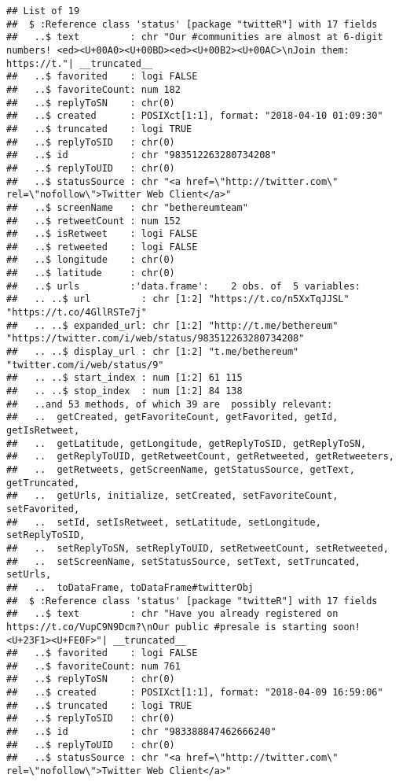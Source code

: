 \documentclass[]{article}
\begin{document}
\begin{verbatim}
## List of 19
##  $ :Reference class 'status' [package "twitteR"] with 17 fields
##   ..$ text         : chr "Our #communities are almost at 6-digit numbers! <ed><U+00A0><U+00BD><ed><U+00B2><U+00AC>\nJoin them: https://t."| __truncated__
##   ..$ favorited    : logi FALSE
##   ..$ favoriteCount: num 182
##   ..$ replyToSN    : chr(0) 
##   ..$ created      : POSIXct[1:1], format: "2018-04-10 01:09:30"
##   ..$ truncated    : logi TRUE
##   ..$ replyToSID   : chr(0) 
##   ..$ id           : chr "983512263280734208"
##   ..$ replyToUID   : chr(0) 
##   ..$ statusSource : chr "<a href=\"http://twitter.com\" rel=\"nofollow\">Twitter Web Client</a>"
##   ..$ screenName   : chr "bethereumteam"
##   ..$ retweetCount : num 152
##   ..$ isRetweet    : logi FALSE
##   ..$ retweeted    : logi FALSE
##   ..$ longitude    : chr(0) 
##   ..$ latitude     : chr(0) 
##   ..$ urls         :'data.frame':    2 obs. of  5 variables:
##   .. ..$ url         : chr [1:2] "https://t.co/n5XxTqJJSL" "https://t.co/4GllRSTe7j"
##   .. ..$ expanded_url: chr [1:2] "http://t.me/bethereum" "https://twitter.com/i/web/status/983512263280734208"
##   .. ..$ display_url : chr [1:2] "t.me/bethereum" "twitter.com/i/web/status/9"
##   .. ..$ start_index : num [1:2] 61 115
##   .. ..$ stop_index  : num [1:2] 84 138
##   ..and 53 methods, of which 39 are  possibly relevant:
##   ..  getCreated, getFavoriteCount, getFavorited, getId, getIsRetweet,
##   ..  getLatitude, getLongitude, getReplyToSID, getReplyToSN,
##   ..  getReplyToUID, getRetweetCount, getRetweeted, getRetweeters,
##   ..  getRetweets, getScreenName, getStatusSource, getText, getTruncated,
##   ..  getUrls, initialize, setCreated, setFavoriteCount, setFavorited,
##   ..  setId, setIsRetweet, setLatitude, setLongitude, setReplyToSID,
##   ..  setReplyToSN, setReplyToUID, setRetweetCount, setRetweeted,
##   ..  setScreenName, setStatusSource, setText, setTruncated, setUrls,
##   ..  toDataFrame, toDataFrame#twitterObj
##  $ :Reference class 'status' [package "twitteR"] with 17 fields
##   ..$ text         : chr "Have you already registered on https://t.co/VupC9N9Dcm?\nOur public #presale is starting soon! <U+23F1><U+FE0F>"| __truncated__
##   ..$ favorited    : logi FALSE
##   ..$ favoriteCount: num 761
##   ..$ replyToSN    : chr(0) 
##   ..$ created      : POSIXct[1:1], format: "2018-04-09 16:59:06"
##   ..$ truncated    : logi TRUE
##   ..$ replyToSID   : chr(0) 
##   ..$ id           : chr "983388847462666240"
##   ..$ replyToUID   : chr(0) 
##   ..$ statusSource : chr "<a href=\"http://twitter.com\" rel=\"nofollow\">Twitter Web Client</a>"

\end{verbatim}
\end{document}
